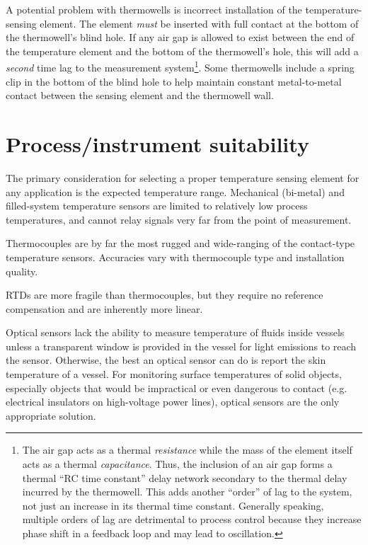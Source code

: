 A potential problem with thermowells is incorrect installation of the temperature-sensing element.  The element \textit{must} be inserted with full contact at the bottom of the thermowell's blind hole.  If any air gap is allowed to exist between the end of the temperature element and the bottom of the thermowell's hole, this will add a \textit{second} time lag to the measurement system\footnote{The air gap acts as a thermal \textit{resistance} while the mass of the element itself acts as a thermal \textit{capacitance}.  Thus, the inclusion of an air gap forms a thermal ``RC time constant'' delay network secondary to the thermal delay incurred by the thermowell.  This adds another ``order'' of lag to the system, not just an increase in its thermal time constant.  Generally speaking, multiple orders of lag are detrimental to process control because they increase phase shift in a feedback loop and may lead to oscillation.}.  Some thermowells include a spring clip in the bottom of the blind hole to help maintain constant metal-to-metal contact between the sensing element and the thermowell wall.





\filbreak
\section{Process/instrument suitability}

The primary consideration for selecting a proper temperature sensing element for any application is the expected temperature range.  Mechanical (bi-metal) and filled-system temperature sensors are limited to relatively low process temperatures, and cannot relay signals very far from the point of measurement.

Thermocouples are by far the most rugged and wide-ranging of the contact-type temperature sensors.  Accuracies vary with thermocouple type and installation quality.

RTDs are more fragile than thermocouples, but they require no reference compensation and are inherently more linear.

Optical sensors lack the ability to measure temperature of fluids inside vessels unless a transparent window is provided in the vessel for light emissions to reach the sensor.  Otherwise, the best an optical sensor can do is report the skin temperature of a vessel.  For monitoring surface temperatures of solid objects, especially objects that would be impractical or even dangerous to contact (e.g. electrical insulators on high-voltage power lines), optical sensors are the only appropriate solution. 

